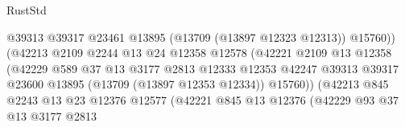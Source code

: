 \begin{lexlean}{RustStd}
\begin{coremodule}
                                              @39313
                                              @39317
                                              @23461
                                              @13895
                                              (@13709 (@13897 @12323 @12313))
                                              @15760))
                                          (@42213
                                            @2109
                                            @2244
                                            @13
                                            @24
                                            @12358
                                            @12578
                                            (@42221
                                              @2109
                                              @13
                                              @12358
                                              (@42229
                                                @589
                                                @37
                                                @13
                                                @3177
                                                @2813
                                                @12333
                                                @12353
                                                @42247
                                                @39313
                                                @39317
                                                @23600
                                                @13895
                                                (@13709 (@13897 @12353 @12334))
                                                @15760))
                                            (@42213
                                              @845
                                              @2243
                                              @13
                                              @23
                                              @12376
                                              @12577
                                              (@42221
                                                @845
                                                @13
                                                @12376
                                                (@42229
                                                  @93
                                                  @37
                                                  @13
                                                  @3177
                                                  @2813

\end{coremodule}
\end{lexlean}
